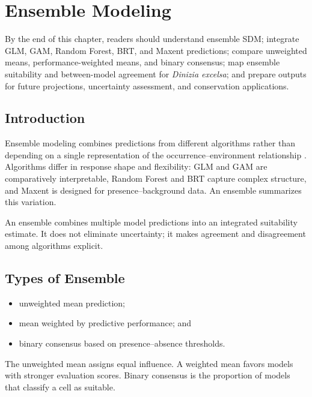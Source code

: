 \chapter[Ensemble Modeling]{Ensemble Modeling}

\begin{objetivos}
By the end of this chapter, readers should understand ensemble SDM; integrate
GLM, GAM, Random Forest, BRT, and Maxent predictions; compare unweighted means,
performance-weighted means, and binary consensus; map ensemble suitability and
between-model agreement for \textit{Dinizia excelsa}; and prepare outputs for
future projections, uncertainty assessment, and conservation applications.
\end{objetivos}

\section{Introduction}

Ensemble modeling combines predictions from different algorithms rather than
depending on a single representation of the occurrence--environment relationship
\parencite{araujo2007ensemble,thuiller2009biomod,guisan2017habitat}. Algorithms
differ in response shape and flexibility: GLM and GAM are comparatively
interpretable, Random Forest and BRT capture complex structure, and Maxent is
designed for presence--background data. An ensemble summarizes this variation.

\begin{conceito}[title={\faBook\quad Ensembles in SDM}]
An ensemble combines multiple model predictions into an integrated suitability
estimate. It does not eliminate uncertainty; it makes agreement and disagreement
among algorithms explicit.
\end{conceito}

\section{Types of Ensemble}
\begin{itemize}
  \item unweighted mean prediction;
  \item mean weighted by predictive performance; and
  \item binary consensus based on presence--absence thresholds.
\end{itemize}
The unweighted mean assigns equal influence. A weighted mean favors models with
stronger evaluation scores. Binary consensus is the proportion of models that
classify a cell as suitable.

